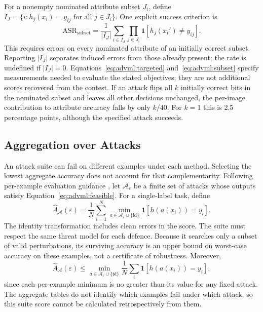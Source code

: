 For a nonempty nominated attribute subset $J_i$, define
$I_J=\{i:h_j(x_i)=y_{ij}\text{ for all }j\in J_i\}$. One explicit success criterion is
\begin{equation}
  \mathrm{ASR}_{\mathrm{subset}}
  =\frac1{|I_J|}\sum_{i\in I_J}\prod_{j\in J_i}
    \mathbf1[h_j(x_i')\neq y_{ij}].
  \label{eq:advml:subset}
\end{equation}
This requires errors on every nominated attribute of an initially correct subset. Reporting
$|I_J|$ separates induced errors from those already present; the rate is undefined if
$|I_J|=0$. Equations~\ref{eq:advml:targeted}
and~\ref{eq:advml:subset} specify measurements needed to evaluate the stated objectives;
they are not additional scores recovered from the contest. If an attack flips all $k$ initially
correct bits in the nominated subset and leaves all other decisions unchanged, the per-image contribution
to attribute accuracy falls by only $k/40$. For $k=1$ this is 2.5 percentage points, although
the specified attack succeeds.

\subsection{Aggregation over Attacks}

An attack suite can fail on different examples under each method. Selecting the lowest
aggregate accuracy does not account for that complementarity. Following per-example
evaluation guidance \cite{carlini2019evaluating}, let $\mathcal A_\varepsilon$ be a finite
set of attacks whose outputs satisfy Equation~\ref{eq:advml:feasible}. For a single-label task,
define
\begin{equation}
  \widehat A_{\mathcal A}(\varepsilon)
  =\frac1N\sum_{i=1}^N
   \min_{a\in\mathcal A_\varepsilon\cup\{\mathrm{id}\}}
   \mathbf1[h(a(x_i))=y_i].
  \label{eq:advml:suite}
\end{equation}
The identity transformation includes clean errors in the score. The suite must respect the
same threat model for each defence. Because it searches only a subset of valid perturbations,
its surviving accuracy is an upper bound on worst-case accuracy on these examples, not a
certificate of robustness. Moreover,
\begin{equation}
  \widehat A_{\mathcal A}(\varepsilon)
  \leq\min_{a\in\mathcal A_\varepsilon\cup\{\mathrm{id}\}}
           \frac1N\sum_i\mathbf1[h(a(x_i))=y_i],
  \label{eq:advml:aggregation-bound}
\end{equation}
since each per-example minimum is no greater than its value for any fixed attack.
The aggregate tables do not identify which examples fail under which attack, so this suite
score cannot be calculated retrospectively from them.

